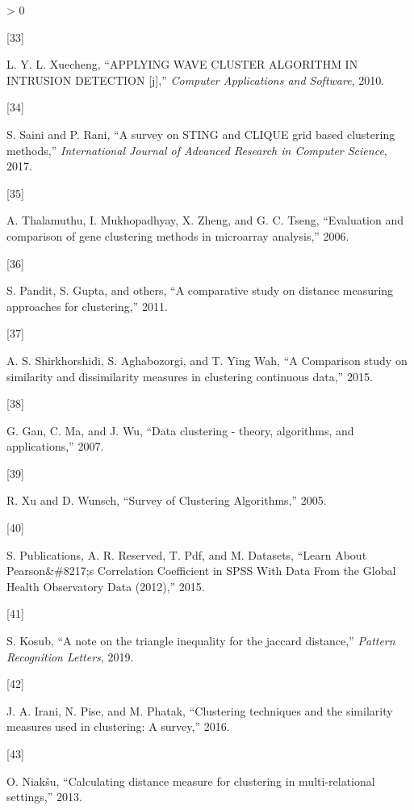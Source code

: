 \documentclass[
]{article}
\newlength{\cslhangindent}
\newlength{\csllabelwidth}
\newenvironment{CSLReferences}[3] %
 {%
  \setlength{\parindent}{0pt}
  \ifodd #1 \everypar{\setlength{\hangindent}{\cslhangindent}}\ignorespaces\fi
  \ifnum #2 > 0
  \setlength{\parskip}{#2\baselineskip}
  \fi
 }%
 {}
\newcommand{\CSLLeftMargin}[1]{\parbox[t]{\csllabelwidth}{#1}}
\newcommand{\CSLRightInline}[1]{\parbox[t]{\linewidth - \csllabelwidth}{#1}}
\begin{document}
\begin{CSLReferences}{0}{0}
\leavevmode\hypertarget{ref-b32}{}%
\CSLLeftMargin{{[}33{]} }
\CSLRightInline{L. Y. L. Xuecheng, {``APPLYING WAVE CLUSTER ALGORITHM IN
INTRUSION DETECTION {[}j{]},''} \emph{Computer Applications and
Software}, 2010.}

\leavevmode\hypertarget{ref-b33}{}%
\CSLLeftMargin{{[}34{]} }
\CSLRightInline{S. Saini and P. Rani, {``A survey on STING and CLIQUE
grid based clustering methods,''} \emph{International Journal of
Advanced Research in Computer Science}, 2017.}

\leavevmode\hypertarget{ref-b34}{}%
\CSLLeftMargin{{[}35{]} }
\CSLRightInline{A. Thalamuthu, I. Mukhopadhyay, X. Zheng, and G. C.
Tseng, {``Evaluation and comparison of gene clustering methods in
microarray analysis,''} 2006.}

\leavevmode\hypertarget{ref-b50}{}%
\CSLLeftMargin{{[}36{]} }
\CSLRightInline{S. Pandit, S. Gupta, and others, {``A comparative study
on distance measuring approaches for clustering,''} 2011.}

\leavevmode\hypertarget{ref-b51}{}%
\CSLLeftMargin{{[}37{]} }
\CSLRightInline{A. S. Shirkhorshidi, S. Aghabozorgi, and T. Ying Wah,
{``{A Comparison study on similarity and dissimilarity measures in
clustering continuous data},''} 2015.}

\leavevmode\hypertarget{ref-b56}{}%
\CSLLeftMargin{{[}38{]} }
\CSLRightInline{G. Gan, C. Ma, and J. Wu, {``Data clustering - theory,
algorithms, and applications,''} 2007.}

\leavevmode\hypertarget{ref-b58}{}%
\CSLLeftMargin{{[}39{]} }
\CSLRightInline{R. Xu and D. Wunsch, {``{Survey of Clustering
Algorithms},''} 2005.}

\leavevmode\hypertarget{ref-b61}{}%
\CSLLeftMargin{{[}40{]} }
\CSLRightInline{S. Publications, A. R. Reserved, T. Pdf, and M.
Datasets, {``{Learn About Pearson{\&}{\#}8217;s Correlation Coefficient
in SPSS With Data From the Global Health Observatory Data (2012)},''}
2015.}

\leavevmode\hypertarget{ref-b35}{}%
\CSLLeftMargin{{[}41{]} }
\CSLRightInline{S. Kosub, {``A note on the triangle inequality for the
jaccard distance,''} \emph{Pattern Recognition Letters}, 2019.}

\leavevmode\hypertarget{ref-b59}{}%
\CSLLeftMargin{{[}42{]} }
\CSLRightInline{J. A. Irani, N. Pise, and M. Phatak, {``Clustering
techniques and the similarity measures used in clustering: A survey,''}
2016.}

\leavevmode\hypertarget{ref-b62}{}%
\CSLLeftMargin{{[}43{]} }
\CSLRightInline{O. Niakšu, {``Calculating distance measure for
clustering in multi-relational settings,''} 2013.}


\end{CSLReferences}
\end{document}
